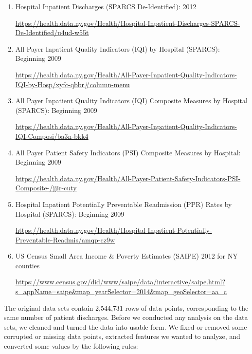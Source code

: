 \documentclass[letterpaper,11pt]{article}
\begin{document}
\begin{enumerate}
  \item Hospital Inpatient Discharges (SPARCS De-Identified): 2012
  
  \url{https://health.data.ny.gov/Health/Hospital-Inpatient-Discharges-SPARCS-De-Identified/u4ud-w55t}
  
    \item All Payer Inpatient Quality Indicators (IQI) by Hospital (SPARCS): Beginning 2009
  
  \url{https://health.data.ny.gov/Health/All-Payer-Inpatient-Quality-Indicators-IQI-by-Hosp/xyfc-qbbr#column-menu}
  
  \item All Payer Inpatient Quality Indicators (IQI) Composite Measures by Hospital (SPARCS): Beginning 2009
  
  \url{https://health.data.ny.gov/Health/All-Payer-Inpatient-Quality-Indicators-IQI-Composi/ba3n-bkk4}
  
  \item All Payer Patient Safety Indicators (PSI) Composite Measures by Hospital: Beginning 2009
  
  \url{https://health.data.ny.gov/Health/All-Payer-Patient-Safety-Indicators-PSI-Composite-/jjir-cuty}
  
    \item Hospital Inpatient Potentially Preventable Readmission (PPR) Rates by Hospital (SPARCS): Beginning 2009
  
  \url{https://health.data.ny.gov/Health/Hospital-Inpatient-Potentially-Preventable-Readmis/amqp-cz9w}
  
      \item US Census Small Area Income \& Poverty Estimates (SAIPE) 2012 for NY counties
  
  \url{https://www.census.gov/did/www/saipe/data/interactive/saipe.html?s_appName=saipe&map_yearSelector=2014&map_geoSelector=aa_c}

  
\end{enumerate}


The original data sets contain 2,544,731 rows of data points, corresponding to the same number of patient discharges. Before we conducted any analysis on the data sets, we cleaned and turned the data into usable form. We fixed or removed some corrupted or missing data points, extracted features we wanted to analyze, and converted some values by the following rules:
\end{document}
